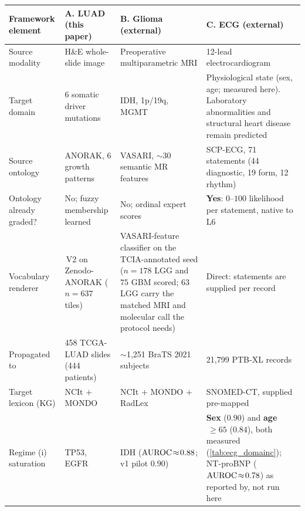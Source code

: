 \footnotesize
\setlength{\tabcolsep}{4pt}
\renewcommand{\arraystretch}{1.15}
\begin{tabularx}{\linewidth}{l X X X}
\toprule
\textbf{Framework element} &
  \textbf{A. LUAD (this paper)} &
  \textbf{B. Glioma (external)} &
  \textbf{C. ECG (external)} \\
\midrule
Source modality
  & H\&E whole-slide image
  & Preoperative multiparametric MRI
  & 12-lead electrocardiogram \\
Target domain
  & 6 somatic driver mutations
  & IDH, 1p/19q, MGMT
  & Physiological state (sex, age; measured here). Laboratory
    abnormalities and structural heart disease remain predicted \\
\midrule
Source ontology
  & ANORAK, 6 growth patterns\cite{anorak2024}
  & VASARI, $\sim$30 semantic MR features\cite{gutman2013vasari,vasari_tcia}
  & SCP-ECG, 71 statements (44 diagnostic, 19 form, 12
    rhythm)\cite{wagner2020ptbxl} \\
Ontology already graded?
  & No; fuzzy membership learned
  & No; ordinal expert scores
  & \textbf{Yes}: $0$--$100$ likelihood per statement, native to L6 \\
Vocabulary renderer
  & \fuzzyarc{}\,V2 on Zenodo-ANORAK ($n=637$ tiles)
  & VASARI-feature classifier on the TCIA-annotated seed
    ($n=178$ LGG and $75$ GBM scored; $63$ LGG carry the matched MRI
    and molecular call the protocol needs)
  & Direct: statements are supplied per record \\
Propagated to
  & 458 TCGA-LUAD slides (444 patients)
  & $\sim$1{,}251 BraTS 2021 subjects\cite{baid2021brats}
  & 21{,}799 PTB-XL records \\
Target lexicon (KG)
  & NCIt $+$ MONDO
  & NCIt $+$ MONDO $+$ RadLex
  & SNOMED-CT, supplied pre-mapped\cite{strodthoff2023ptbxlplus} \\
\midrule
Regime (i) saturation
  & TP53, EGFR
  & IDH ($\text{AUROC}\!\approx\!0.88$\cite{chang2018radiogenomics};
    v1 pilot $0.90$)
  & \textbf{Sex} ($0.90$) and \textbf{age}$\,\geq\!65$ ($0.84$), both
    measured (\cref{tab:ecg_domainc}); NT-proBNP
    ($\text{AUROC}\!\approx\!0.78$) as reported by\cite{xiao2025anyecglab},
    not run here \\

\end{tabularx}
